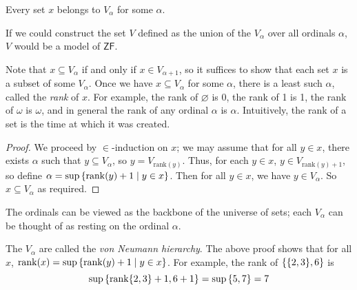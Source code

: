 \begin{theorem}
    Every set \( x \) belongs to \( V_\alpha \) for some \( \alpha \).
\end{theorem}
If we could construct the set \( V \) defined as the union of the \( V_\alpha \) over all ordinals \( \alpha \), \( V \) would be a model of \( \mathsf{ZF} \).
\begin{remark}
    Note that \( x \subseteq V_\alpha \) if and only if \( x \in V_{\alpha+1} \), so it suffices to show that each set \( x \) is a subset of some \( V_\alpha \).
    Once we have \( x \subseteq V_\alpha \) for some \( \alpha \), there is a least such \( \alpha \), called the \emph{rank} of \( x \).
    For example, the rank of \( \varnothing \) is 0, the rank of 1 is 1, the rank of \( \omega \) is \( \omega \), and in general the rank of any ordinal \( \alpha \) is \( \alpha \).
    Intuitively, the rank of a set is the time at which it was created.
\end{remark}
\begin{proof}
    We proceed by \( \in \)-induction on \( x \); we may assume that for all \( y \in x \), there exists \( \alpha \) such that \( y \subseteq V_\alpha \), so \( y = V_{\mathrm{rank}(y)} \).
    Thus, for each \( y \in x \), \( y \in V_{\mathrm{rank}(y)+1} \), so define \( \alpha = \sup\qty{\mathrm{rank}(y) + 1 \mid y \in x} \).
    Then for all \( y \in x \), we have \( y \in V_\alpha \).
    So \( x \subseteq V_\alpha \) as required.
\end{proof}
The ordinals can be viewed as the backbone of the universe of sets; each \( V_\alpha \) can be thought of as resting on the ordinal \( \alpha \).
\begin{remark}
    The \( V_\alpha \) are called the \emph{von Neumann hierarchy}.
    The above proof shows that for all \( x \), \( \mathrm{rank}(x) = \sup\qty{\mathrm{rank}(y) + 1 \mid y \in x} \).
    For example, the rank of \( \qty{\qty{2, 3}, 6} \) is
    \[ \sup\qty{\mathrm{rank}\qty{2, 3} + 1, 6 + 1} = \sup\qty{5, 7} = 7 \]
\end{remark}
